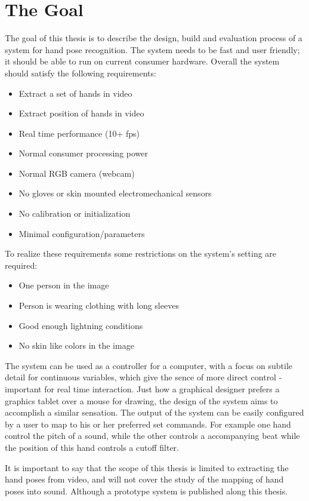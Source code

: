 \section{The Goal}
\label{sec:goal}
The goal of this thesis is to describe the design, build and evaluation process of a system for hand pose recognition. The system needs to be fast and user friendly; it should be able to run on current consumer hardware. Overall the system should satisfy the following requirements:

\begin{itemize}
	\item Extract a set of hands in video
	\item Extract position of hands in video
	\item Real time performance (10+ fps)
	\item Normal consumer processing power
	\item Normal RGB camera (webcam)
	\item No gloves or skin mounted electromechanical sensors
	\item No calibration or initialization
	\item Minimal configuration/parameters
\end{itemize}
	
To realize these requirements some restrictions on the system's setting are required:

\begin{itemize}
	\item One person in the image
	\item Person is wearing clothing with long sleeves
	\item Good enough lightning conditions
	\item No skin like colors in the image
\end{itemize}

The system can be used as a controller for a computer, with a focus on subtile detail for continuous variables, which give the sence of more direct control - important for real time interaction. Just how a graphical designer prefers a graphics tablet over a mouse for drawing, the design of the system aims to accomplish a similar sensation. The output of the system can be easily configured by a user to map to his or her preferred set commands. For example one hand control the pitch of a sound, while the other controls a accompanying beat while the position of this hand controls a cutoff filter. 

It is important to say that the scope of this thesis is limited to extracting the hand poses from video, and will not cover the study of the mapping of hand poses into sound. Although a prototype system is published along this thesis.



